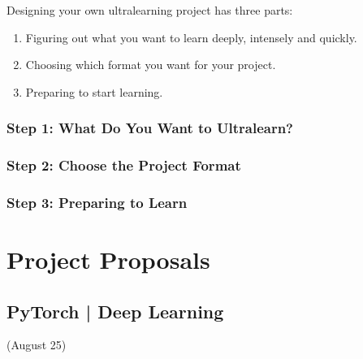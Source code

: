 Designing your own ultralearning project has three parts:

\begin{enumerate}
	\item Figuring out what you want to learn deeply, intensely and quickly.

	\item Choosing which format you want for your project.

	\item Preparing to start learning.
\end{enumerate}

\subsubsection*{Step 1: What Do You Want to Ultralearn?}

\subsubsection*{Step 2: Choose the Project Format}


\subsubsection*{Step 3: Preparing to Learn}

\section{Project Proposals}

\subsection{PyTorch | Deep Learning}

(August 25)

